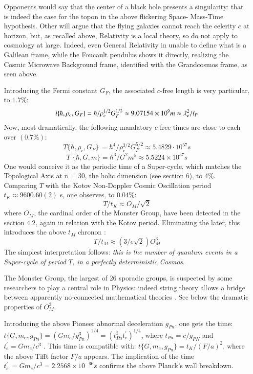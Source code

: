 \documentclass[twoside,draft]{article}
\begin{document}
\begin{sloppypar}
Opponents would say that the
center of a black hole presents a singularity: that is indeed the case for the topon in the above flickering Space-
Mass-Time hypothesis. Other will argue that the flying galaxies cannot reach the celerity $c$ at
horizon, but, as recalled above, Relativity is a local theory, so do not apply to cosmology at large.
Indeed, even General Relativity in unable to define what is a Galilean frame, while the Foucault
pendulus shows it directly, realizing the Cosmic Microwave Background frame, identified with the
Grandcosmos frame, as seen above.

Introducing the Fermi constant $G_{F}$, the associated $c$-free length is very particular, to $1.7\%$:
$$l\{\hbar,\rho_{c},G_{F}\} = \hbar/\rho_{c}^{1/2} G_{F}^{1/2} \approx 9.07154 \times 10^{9} m \approx \lambdabar_{e}^{2}/l_{P}$$
Now, most dramatically, the following mandatory $c$-free times are close to each over $(0.7\%)$:
\begin{equation}
T\{\hbar,\rho_{c} ,G_{F} \}\, = \hbar^{4} /\rho_{c}^{3/2} G_{F}^{5/2} \approx 5.4829 \cdot 10^{57} s
\end{equation}
\begin{equation}
T^{\prime}\{\hbar,G,m\} = \hbar^{3} /G^{2} m^{5} \approx 5.5224 \times 10^{57} s
\end{equation}
One would conceive it as the periodic time of a Super-cycle, which matches the Topological Axis at n = 30,
the holic dimension (see section 6), to 4\%. Comparing $T$ with the Kotov Non-Doppler Cosmic
Oscillation period $t_{K} \approx 9600.60(2)$ s, one observes, to $0.04\%$:
$$T/t_{K} \approx O_{M} /\sqrt{2}$$
where $O_{M}$, the cardinal order of the Monster Group, have been detected in the section 4.2, again in relation with the Kotov period. Eliminating the later, this introduces the above $t_M$ chronon :
\begin{equation}
T/t_M \approx (3/e\sqrt{2})O_M^3
\end{equation}
The simplest interpretation follows: \textit{this is the number of quantum events in a Super-cycle of period $T$, in a perfectly deterministic Cosmos}. 

The  Monster  Group,  the largest of 26 sporadic groups, is suspected by some researchers to play a central role in Physics: indeed string theory allows a bridge between apparently no-connected mathematical theories \cite{Borcherds}. See below the dramatic properties of $O_M^3$.

Introducing the above Pioneer abnormal deceleration $g_{Pn}$, one gets the time: 
$
t\{G, m_{e} , g_{Pn} \} = (Gm_{e} /g_{Pn}^{3} )^{1/4} = (t_{Pn}^{3} t^{\prime}_{e} )^{1/4}
$, where $t_{Pn} = c/g_{PN}$ and $t^{\prime}_{e} = Gm_{e} /c^{3}$ . This time is compatible with:
$
t\{G, m_{e} , g_{Pn} \} = t_{K} /(F/a)^{2}
$, where the above Tifft factor $F/a$ appears. The implication of the time 
$t^{\prime}_{e}\, = Gm_{e} /c^{3} = 2.2568 \times 10^{-66} s$
confirms the above Planck's wall breakdown.


\end{sloppypar}
\end{document}
